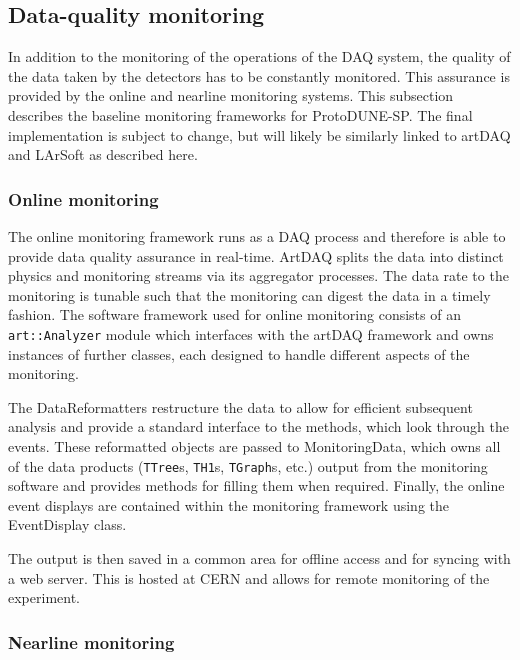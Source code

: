 \subsection{Data-quality monitoring}

In addition to the monitoring of the operations of the DAQ system, the
quality of the data taken by the detectors has to be constantly monitored.
This assurance is provided by the online and nearline monitoring systems.
This subsection describes the baseline monitoring frameworks for ProtoDUNE-SP.  
The final implementation is subject to change, but will likely be similarly
linked to artDAQ and LArSoft as described here.

\subsubsection{Online monitoring}

The online monitoring framework runs as a DAQ process and therefore is
able to provide data quality assurance in real-time. ArtDAQ splits the  
data into distinct physics and monitoring streams via its aggregator processes.  
The data rate to the monitoring is tunable such that the monitoring 
can digest the data in a timely fashion.
The software framework used for online monitoring 
consists of an
\texttt{art::Analyzer} module which interfaces with the artDAQ framework and
owns instances of further classes, each designed to handle different aspects
of the monitoring.  

The DataReformatters restructure the data to allow for efficient subsequent
analysis and provide a standard interface to the methods, which look through
the events.  These reformatted objects are passed to MonitoringData, which
owns all of the data products (\texttt{TTree}s, \texttt{TH1}s, \texttt{TGraph}s,
etc.) output from the monitoring software and provides methods for filling
them when required.  Finally, the online event displays are
contained within the monitoring framework using the EventDisplay class.

The output is then saved in a common area for offline access and for syncing
with a web server. This is hosted at CERN and allows for remote
monitoring of the experiment.

\subsubsection{Nearline monitoring}

